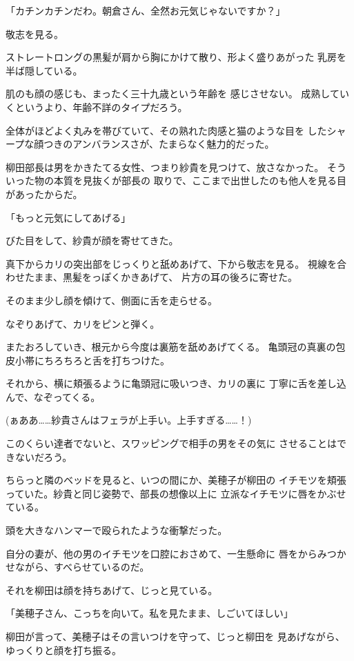 ﻿\documentclass[
    book,tate,
    line_length=30zw,
    jafontsize=12pt,
    paper=b5j,
    landscape,
    ]{jlreq}
\begin{document}
「カチンカチンだわ。朝倉さん、全然お元気じゃないですか？」

敬志を見る。

ストレートロングの黒髪が肩から胸にかけて散り、形よく盛りあがった
乳房を半ば隠している。

肌のも顔の感じも、まったく三十九歳という年齢を
感じさせない。 成熟していくというより、年齢不詳のタイプだろう。

全体がほどよく丸みを帯びていて、その熟れた肉感と猫のような目を
したシャープな顔つきのアンバランスさが、たまらなく魅力的だった。

柳田部長は男をかきたてる女性、つまり紗貴を見つけて、放さなかった。
そういった物の本質を見抜くが部長の
取りで、ここまで出世したのも他人を見る目があったからだ。

「もっと元気にしてあげる」

びた目をして、紗貴が顔を寄せてきた。

真下からカリの突出部をじっくりと舐めあげて、下から敬志を見る。
視線を合わせたまま、黒髪をっぽくかきあげて、
片方の耳の後ろに寄せた。

そのまま少し顔を傾けて、側面に舌を走らせる。

なぞりあげて、カリをピンと弾く。

またおろしていき、根元から今度は裏筋を舐めあげてくる。
亀頭冠の真裏の包皮小帯にちろちろと舌を打ちつけた。

それから、横に頬張るように亀頭冠に吸いつき、カリの裏に
丁寧に舌を差し込んで、なぞってくる。

(ぁああ……紗貴さんはフェラが上手い。上手すぎる……！)

このくらい達者でないと、スワッピングで相手の男をその気に
させることはできないだろう。

ちらっと隣のベッドを見ると、いつの間にか、美穂子が柳田の
イチモツを頬張っていた。紗貴と同じ姿勢で、部長の想像以上に
立派なイチモツに唇をかぶせている。

頭を大きなハンマーで殴られたような衝撃だった。

自分の妻が、他の男のイチモツを口腔におさめて、一生懸命に
唇をからみつかせながら、すべらせているのだ。

それを柳田は顔を持ちあげて、じっと見ている。

「美穂子さん、こっちを向いて。私を見たまま、しごいてほしい」

柳田が言って、美穂子はその言いつけを守って、じっと柳田を
見あげながら、ゆっくりと顔を打ち振る。
\end{document}
